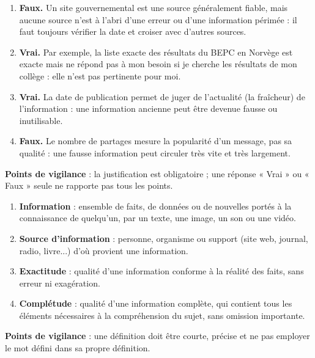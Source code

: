\documentclass[11pt]{article}
\newcommand{\cle}[1]{{\popxbold\color{popdark}#1}}
\begin{document}
\begin{corrige}
\begin{enumerate}
\item \textbf{Faux.} Un site gouvernemental est une source généralement fiable, mais aucune source n'est à l'abri d'une erreur ou d'une information périmée : il faut toujours vérifier la date et croiser avec d'autres sources.
\item \textbf{Vrai.} Par exemple, la liste exacte des résultats du BEPC en Norvège est exacte mais ne répond pas à mon besoin si je cherche les résultats de mon collège : elle n'est pas \cle{pertinente} pour moi.
\item \textbf{Vrai.} La date de publication permet de juger de l'\cle{actualité} (la fraîcheur) de l'information : une information ancienne peut être devenue fausse ou inutilisable.
\item \textbf{Faux.} Le nombre de partages mesure la popularité d'un message, pas sa qualité : une fausse information peut circuler très vite et très largement.
\end{enumerate}
\textbf{Points de vigilance} : la justification est obligatoire ; une réponse « Vrai » ou « Faux » seule ne rapporte pas tous les points.
\end{corrige}

\begin{corrige}
\begin{enumerate}
\item \textbf{Information} : ensemble de faits, de données ou de nouvelles portés à la connaissance de quelqu'un, par un texte, une image, un son ou une vidéo.
\item \textbf{Source d'information} : personne, organisme ou support (site web, journal, radio, livre...) d'où provient une information.
\item \textbf{Exactitude} : qualité d'une information conforme à la réalité des faits, sans erreur ni exagération.
\item \textbf{Complétude} : qualité d'une information complète, qui contient tous les éléments nécessaires à la compréhension du sujet, sans omission importante.
\end{enumerate}
\textbf{Points de vigilance} : une définition doit être courte, précise et ne pas employer le mot défini dans sa propre définition.
\end{corrige}
\end{document}
